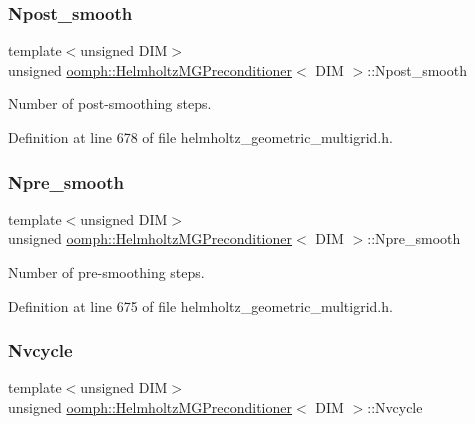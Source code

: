 \subsubsection{\texorpdfstring{Npost\+\_\+smooth}{Npost\_smooth}}
{\footnotesize\ttfamily template$<$unsigned D\+IM$>$ \\
unsigned \hyperlink{classoomph_1_1HelmholtzMGPreconditioner}{oomph\+::\+Helmholtz\+M\+G\+Preconditioner}$<$ D\+IM $>$\+::Npost\+\_\+smooth\hspace{0.3cm}{\ttfamily [private]}}



Number of post-\/smoothing steps. 



Definition at line 678 of file helmholtz\+\_\+geometric\+\_\+multigrid.\+h.

\mbox{\label{classoomph_1_1HelmholtzMGPreconditioner_a61acd84465a380527d9b0dc24b85ac42}} 
\subsubsection{\texorpdfstring{Npre\+\_\+smooth}{Npre\_smooth}}
{\footnotesize\ttfamily template$<$unsigned D\+IM$>$ \\
unsigned \hyperlink{classoomph_1_1HelmholtzMGPreconditioner}{oomph\+::\+Helmholtz\+M\+G\+Preconditioner}$<$ D\+IM $>$\+::Npre\+\_\+smooth\hspace{0.3cm}{\ttfamily [private]}}



Number of pre-\/smoothing steps. 



Definition at line 675 of file helmholtz\+\_\+geometric\+\_\+multigrid.\+h.

\mbox{\label{classoomph_1_1HelmholtzMGPreconditioner_ad7cd9523e0f32e2f882d570db7382d6c}} 
\subsubsection{\texorpdfstring{Nvcycle}{Nvcycle}}
{\footnotesize\ttfamily template$<$unsigned D\+IM$>$ \\
unsigned \hyperlink{classoomph_1_1HelmholtzMGPreconditioner}{oomph\+::\+Helmholtz\+M\+G\+Preconditioner}$<$ D\+IM $>$\+::Nvcycle\hspace{0.3cm}{\ttfamily [private]}}



